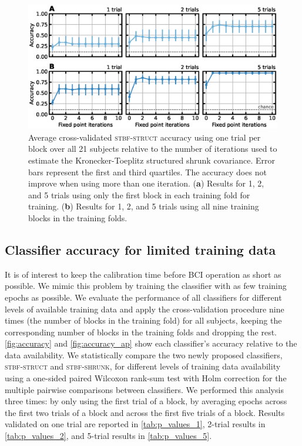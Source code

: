   \begin{figure}
		\includegraphics[width=\linewidth]{figures/stbf_struct/fpi.eps}
    \caption[Average cross-validated \textsc{stbf-struct} accuracy]{%
      Average cross-validated \textsc{stbf-struct} accuracy using
			one trial per block over all 21 subjects
			relative to the number of iterations used to estimate the Kronecker-Toeplitz structured shrunk
			covariance. Error bars represent the first and third quartiles. The
			accuracy does not improve when using more than one iteration.
			(\textbf{a}) Results for 1, 2, and 5 trials using only the first block in each
			training fold for training. (\textbf{b}) Results
			for 1, 2, and 5 trials using
			all nine training blocks in the training folds.
		}
		\label{fig:iterations}
	\end{figure}

	\subsection{Classifier accuracy for limited training data}
	It is of interest to keep the calibration time before BCI
	operation as short as possible.
	We mimic this problem by training the classifier with as few training epochs as possible.
	We evaluate the performance of all classifiers for different levels of
	available training data and apply the cross-validation procedure nine times (the number of blocks in the training fold) for all subjects, keeping the
	corresponding number of blocks in the training folds and dropping the rest.
	\autoref{fig:accuracy} and \autoref{fig:accuracy_ap} show each classifier's
	accuracy relative to the data availability.
	We statistically compare the two newly proposed classifiers,
	\textsc{stbf-struct} and \textsc{stbf-shrunk}, for different levels of training
	data availability using a one-sided paired Wilcoxon rank-sum test with Holm correction for the multiple pairwise comparisons between classifiers.
	We performed this analysis three times: by only using the first trial of a
	block, by averaging epochs across the first two trials of a block and across
	the first five trials of a block.
	Results validated on one trial are reported in \autoref{tab:p_values_1}, 2-trial results
	in \autoref{tab:p_values_2}, and 5-trial results in \autoref{tab:p_values_5}.

